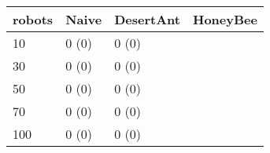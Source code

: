 \begin{tabular} {|l|l|l|l|}
\hline
robots & Naive & DesertAnt & HoneyBee \\
\hline
10 & 0 (0)  & 0 (0)  &  \\
30 & 0 (0)  & 0 (0)  &  \\
50 & 0 (0)  & 0 (0)  &  \\
70 & 0 (0)  & 0 (0)  &  \\
100 & 0 (0)  & 0 (0)  &  \\
\hline
\end{tabular}
